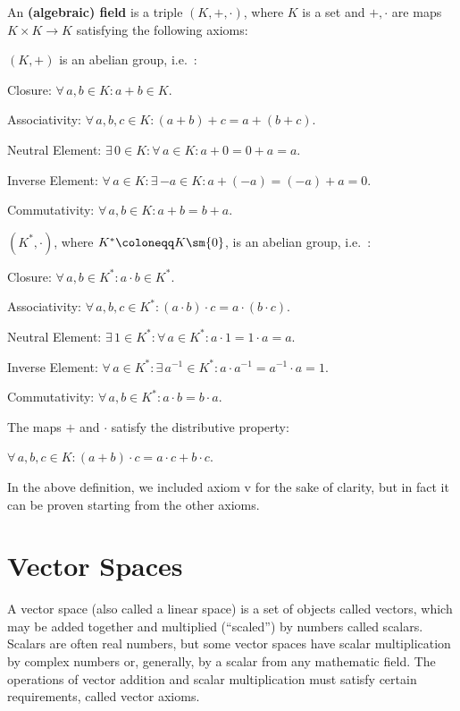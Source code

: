 \bd [Field]
An \textbf{(algebraic) field} is a triple $(K,+, \cdot)$, where $K$ is a set and $+,\cdot$ are maps $K\times K \to K$
satisfying the following axioms:
\bit
\item $(K,+)$ is an abelian group, i.e.\ :
\ben
\item[i)] Closure: $\forall \, a,b \in K : a + b \in K$.
\item[ii)] Associativity: $\forall \, a,b,c \in K : (a+b)+c=a+(b+c)$.
\item[iii)] Neutral Element: $\exists \, 0 \in K : \forall \, a \in K : a+0=0+a=a$.
\item[iv)] Inverse Element: $\forall \, a \in K : \exists \, {-a} \in K : a+(-a)=(-a)+a=0$.
\item[v)] Commutativity: $\forall \, a,b \in K : a+b=b+a$.
\een

\item $(K^*,\cdot)$, where $K^* \coloneqq K\sm\{0\}$, is an abelian group, i.e.\ :
\ben
\item[vi)] Closure: $\forall \, a,b \in K^* : a \cdot b \in K^*$.
\item[vii)] Associativity: $\forall \, a,b,c \in K^* : (a\cdot b)\cdot c=a\cdot (b\cdot c)$.
\item[viii)] Neutral Element: $\exists \, 1 \in K^* : \forall \, a \in K^* : a\cdot 1=1\cdot a=a$.
\item[ix)] Inverse Element: $\forall \, a \in K^* : \exists \, a^{-1} \in K^* : a\cdot a^{-1}=a^{-1} \cdot a=1$.
\item[x)] Commutativity: $\forall \, a,b \in K^* : a\cdot b=b\cdot a$.
\een

\item The maps $+$ and $\cdot$ satisfy the distributive property:
\ben
\item[xi)] $\forall \, a,b,c \in K : (a+ b)\cdot c=a\cdot c + b\cdot c$.
\een
\eit
\ed

In the above definition, we included axiom v for the sake of clarity, but in fact it can be proven starting from the
other axioms.

\section{Vector Spaces}

A vector space (also called a linear space) is a set of objects called vectors, which may be added together and
multiplied (``scaled'') by numbers called scalars. Scalars are often real numbers, but some vector spaces have scalar
multiplication by complex numbers or, generally, by a scalar from any mathematic field. The operations of vector
addition and scalar multiplication must satisfy certain requirements, called vector axioms.

